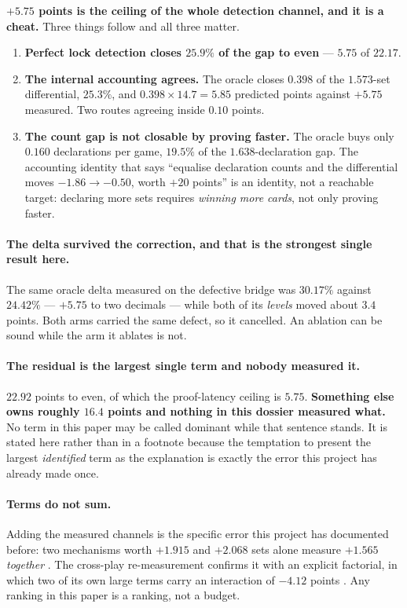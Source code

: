 \documentclass[11pt]{article}
\begin{document}
\textbf{$+5.75$ points is the ceiling of the whole detection channel, and it is a cheat.} Three
things follow and all three matter.

\begin{enumerate}
\item \textbf{Perfect lock detection closes $25.9\%$ of the gap to even} --- $5.75$ of $22.17$.
\item \textbf{The internal accounting agrees.} The oracle closes $0.398$ of the $1.573$-set
differential, $25.3\%$, and $0.398 \times 14.7 = 5.85$ predicted points against $+5.75$ measured.
Two routes agreeing inside $0.10$ points.
\item \textbf{The count gap is not closable by proving faster.} The oracle buys only $0.160$
declarations per game, $19.5\%$ of the $1.638$-declaration gap. The accounting identity that says
``equalise declaration counts and the differential moves $-1.86 \to -0.50$, worth $+20$ points'' is
an identity, not a reachable target: declaring more sets requires \emph{winning more cards}, not
only proving faster.
\end{enumerate}

\paragraph{The delta survived the correction, and that is the strongest single result here.} The
same oracle delta measured on the defective bridge was $30.17\%$ against $24.42\%$ --- $+5.75$ to
two decimals --- while both of its \emph{levels} moved about $3.4$ points. Both arms carried the
same defect, so it cancelled. An ablation can be sound while the arm it ablates is not.

\paragraph{The residual is the largest single term and nobody measured it.} $22.92$ points to even,
of which the proof-latency ceiling is $5.75$. \textbf{Something else owns roughly $16.4$ points and
nothing in this dossier measured what.} No term in this paper may be called dominant while that
sentence stands. It is stated here rather than in a footnote because the temptation to present the
largest \emph{identified} term as the explanation is exactly the error this project has already made
once.

\paragraph{Terms do not sum.} Adding the measured channels is the specific error this project has
documented before: two mechanisms worth $+1.915$ and $+2.068$ sets alone measure $+1.565$
\emph{together} \cite{asking}. The cross-play re-measurement confirms it with an explicit factorial,
in which two of its own large terms carry an interaction of $-4.12$ points \cite{loses}. Any ranking
in this paper is a ranking, not a budget.
\end{document}
